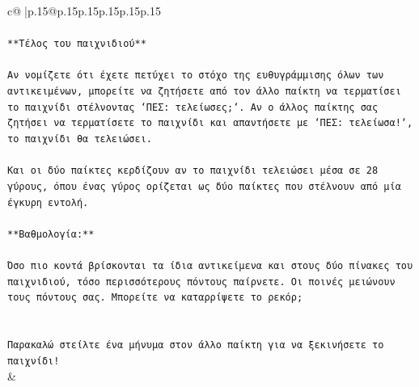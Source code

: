 \documentclass{article}
\begin{document}
{\begin{supertabular}{c@{$\;$}|p{.15\linewidth}@{}p{.15\linewidth}p{.15\linewidth}p{.15\linewidth}p{.15\linewidth}p{.15\linewidth}}
{{{\\ 
\\ 
\texttt{**Τέλος του παιχνιδιού**} \\
\\ 
\texttt{Αν νομίζετε ότι έχετε πετύχει το στόχο της ευθυγράμμισης όλων των αντικειμένων, μπορείτε να ζητήσετε από τον άλλο παίκτη να τερματίσει το παιχνίδι στέλνοντας `ΠΕΣ: τελείωσες;`. Αν ο άλλος παίκτης σας ζητήσει να τερματίσετε το παιχνίδι και απαντήσετε με `ΠΕΣ: τελείωσα!`, το παιχνίδι θα τελειώσει.} \\
\\ 
\texttt{Και οι δύο παίκτες κερδίζουν αν το παιχνίδι τελειώσει μέσα σε 28 γύρους, όπου ένας γύρος ορίζεται ως δύο παίκτες που στέλνουν από μία έγκυρη εντολή.} \\
\\ 
\texttt{**Βαθμολογία:**} \\
\\ 
\texttt{Όσο πιο κοντά βρίσκονται τα ίδια αντικείμενα και στους δύο πίνακες του παιχνιδιού, τόσο περισσότερους πόντους παίρνετε. Οι ποινές μειώνουν τους πόντους σας. Μπορείτε να καταρρίψετε το ρεκόρ;} \\
\\ 
\\ 
\texttt{Παρακαλώ στείλτε ένα μήνυμα στον άλλο παίκτη για να ξεκινήσετε το παιχνίδι!} \\
            }
        }
    }
    & \\ \\


\end{supertabular}}
\end{document}
